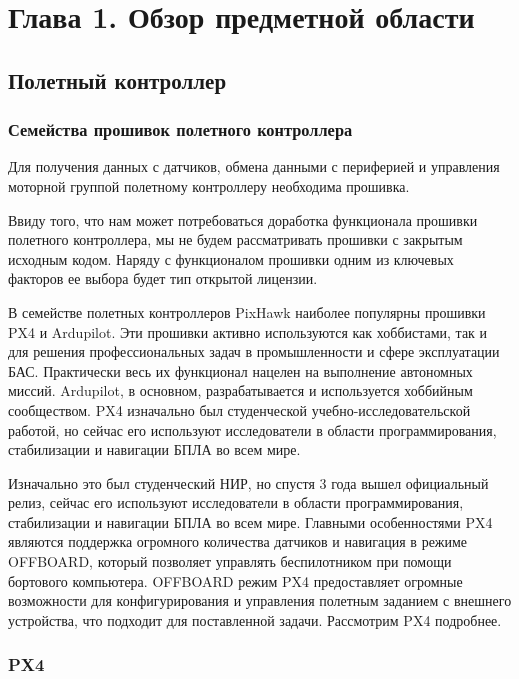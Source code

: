 
\section{Глава 1. Обзор предметной области}

\subsection{Полетный контроллер}
\subsubsection{Семейства прошивок полетного контроллера}
Для получения данных с датчиков, обмена данными с периферией и управления моторной группой полетному контроллеру необходима прошивка.

Ввиду того, что нам может потребоваться доработка функционала прошивки полетного контроллера, мы не будем рассматривать прошивки с закрытым исходным кодом. Наряду с функционалом прошивки одним из ключевых факторов ее выбора будет тип открытой лицензии.

В семействе полетных контроллеров PixHawk наиболее популярны прошивки PX4 и Ardupilot. Эти прошивки активно используются как хоббистами, так и для решения профессиональных задач в промышленности и сфере эксплуатации БАС. Практически весь их функционал нацелен на выполнение автономных миссий. Ardupilot, в основном, разрабатывается и используется хоббийным сообществом. PX4 изначально был студенческой учебно-исследовательской работой, но сейчас его используют исследователи в области программирования, стабилизации и навигации БПЛА во всем мире.

Изначально это был студенческий НИР, но спустя 3 года вышел официальный релиз, сейчас его используют исследователи в области программирования, стабилизации и навигации БПЛА во всем мире. Главными особенностями PX4 являются поддержка огромного количества датчиков и навигация в режиме OFFBOARD, который позволяет управлять беспилотником при помощи бортового компьютера. OFFBOARD режим PX4 предоставляет огромные возможности для конфигурирования и управления полетным заданием с внешнего устройства, что подходит для поставленной задачи. Рассмотрим PX4 подробнее.

\subsubsection{PX4}

